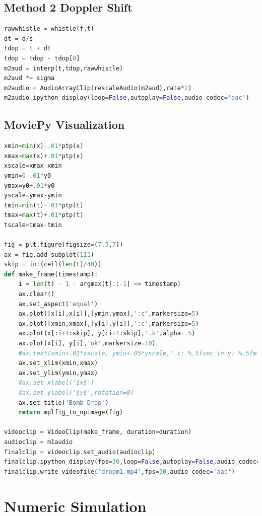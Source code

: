 \documentclass[%
 reprint,
 amsmath,amssymb,
 aps,
]{revtex4-1}
\begin{document}
\subsection{\label{sec:codemethod2}Method 2 Doppler Shift}

\begin{lstlisting}[label=lst:method2,language=Python]
rawwhistle = whistle(f,t)
dt = d/s
tdop = t + dt
tdop = tdop - tdop[0]
m2aud = interp(t,tdop,rawwhistle)
m2aud *= sigma
m2audio = AudioArrayClip(rescaleAudio(m2aud),rate*2)
m2audio.ipython_display(loop=False,autoplay=False,audio_codec='aac')
\end{lstlisting}

\subsection{\label{sec:codemoviepy}MoviePy Visualization}

\begin{lstlisting}[label=lst:moviepy,language=Python]
xmin=min(x)-.01*ptp(x)
xmax=max(x)+.01*ptp(x)
xscale=xmax-xmin
ymin=0-.01*y0
ymax=y0+.01*y0
yscale=ymax-ymin
tmin=min(t)-.01*ptp(t)
tmax=max(t)+.01*ptp(t)
tscale=tmax-tmin

fig = plt.figure(figsize=(7.5,7))
ax = fig.add_subplot(111)
skip = int(ceil(len(t)/40))
def make_frame(timestamp):
    i = len(t) - 1 - argmax(t[::-1] <= timestamp)
    ax.clear()
    ax.set_aspect('equal')
    ax.plot([x[i],x[i]],[ymin,ymax],':c',markersize=5)
    ax.plot([xmin,xmax],[y[i],y[i]],':c',markersize=5)
    ax.plot(x[:i+1:skip], y[:i+1:skip],'.k',alpha=.5)
    ax.plot(x[i], y[i],'ok',markersize=10)
    #ax.text(xmin+.01*xscale, ymin+.05*yscale,' t: %.5fsec \n y: %.5fm' % (t[i],y[i]))
    ax.set_xlim(xmin,xmax)
    ax.set_ylim(ymin,ymax)
    #ax.set_xlabel('$x$')
    #ax.set_ylabel('$y$',rotation=0)
    ax.set_title('Bomb Drop')
    return mplfig_to_npimage(fig)

videoclip = VideoClip(make_frame, duration=duration)
audioclip = m1audio
finalclip = videoclip.set_audio(audioclip)
finalclip.ipython_display(fps=30,loop=False,autoplay=False,audio_codec='aac')
finalclip.write_videofile('dropm1.mp4',fps=30,audio_codec='aac')
\end{lstlisting}

\section{\label{sec:numsim}Numeric Simulation}
\end{document}
